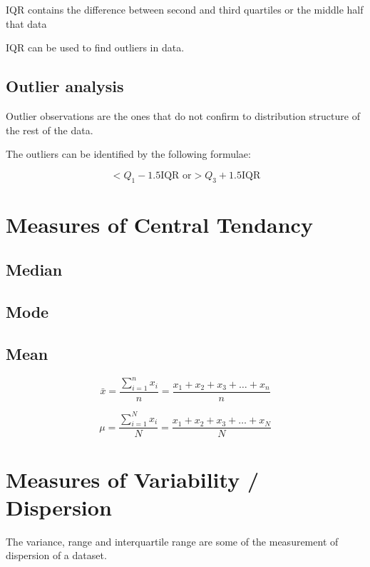 \documentclass[12pt]{article}
\begin{document}
IQR contains the {difference between} second and third quartiles  or the middle half that data

IQR can be used to find outliers in data.

\subsection{Outlier analysis}

Outlier observations are the ones that do not confirm to distribution structure of the rest of the data.

The outliers can be identified by the following formulae:

\begin{equation}
    < Q_1 - 1.5\text{IQR or} > Q_3 + 1.5\text{IQR}
\end{equation}


\section{Measures of Central Tendancy}

\subsection{Median}
\subsection{Mode}
\subsection{Mean}

\begin{equation}
    \bar{x} = \frac{\sum_{i = 1}^{n} x_i}{n}= \frac{x_1 + x_2 + x_3 + \ldots + x_n}{n}
\end{equation}


\begin{equation}
    \mu = \frac{\sum_{i = 1}^{N} x_i}{N}= \frac{x_1 + x_2 + x_3 + \ldots + x_N}{N}
\end{equation}



\section{Measures of Variability / Dispersion}
The variance, range and interquartile range are some of the measurement of dispersion of a dataset.
\end{document}
